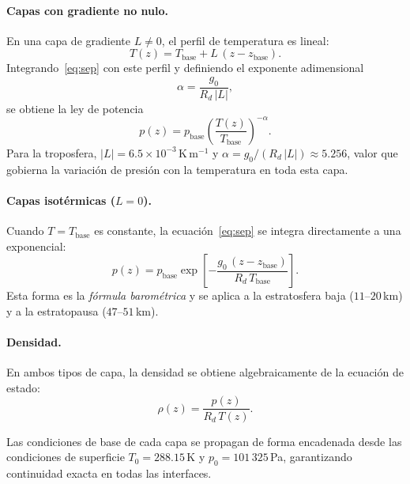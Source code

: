 \documentclass[12pt, a4paper]{article}
\begin{document}
\paragraph{Capas con gradiente no nulo.}
En una capa de gradiente $L \neq 0$, el perfil de temperatura es lineal:
\begin{equation}
	T(z) = T_\text{base} + L\,(z - z_\text{base}).
	\label{eq:T_lineal}
\end{equation}
Integrando~\eqref{eq:sep} con este perfil y definiendo el exponente
adimensional
\begin{equation}
	\alpha = \frac{g_0}{R_d\,|L|},
	\label{eq:alpha}
\end{equation}
se obtiene la ley de potencia
\begin{equation}
	p(z) = p_\text{base}
	\left(\frac{T(z)}{T_\text{base}}\right)^{-\alpha}.
	\label{eq:p_tropo}
\end{equation}
Para la troposfera, $|L| = 6.5 \times 10^{-3}\,\mathrm{K\,m^{-1}}$ y
$\alpha = g_0 / (R_d\,|L|) \approx 5.256$, valor que gobierna la
variación de presión con la temperatura en toda esta capa.

\paragraph{Capas isotérmicas ($L = 0$).}
Cuando $T = T_\text{base}$ es constante, la ecuación~\eqref{eq:sep}
se integra directamente a una exponencial:
\begin{equation}
	p(z) = p_\text{base}
	\exp\!\left[-\frac{g_0\,(z - z_\text{base})}{R_d\,T_\text{base}}\right].
	\label{eq:p_iso}
\end{equation}
Esta forma es la \textit{fórmula barométrica} y se aplica a la
estratosfera baja ($11$--$20$\,km) y a la estratopausa ($47$--$51$\,km).

\paragraph{Densidad.}
En ambos tipos de capa, la densidad se obtiene algebraicamente de la
ecuación de estado:
\begin{equation}
	\rho(z) = \frac{p(z)}{R_d\,T(z)}.
	\label{eq:rho}
\end{equation}

Las condiciones de base de cada capa se propagan de forma encadenada
desde las condiciones de superficie $T_0 = 288.15$\,K y
$p_0 = 101\,325$\,Pa, garantizando continuidad exacta en todas las
interfaces.
\end{document}
